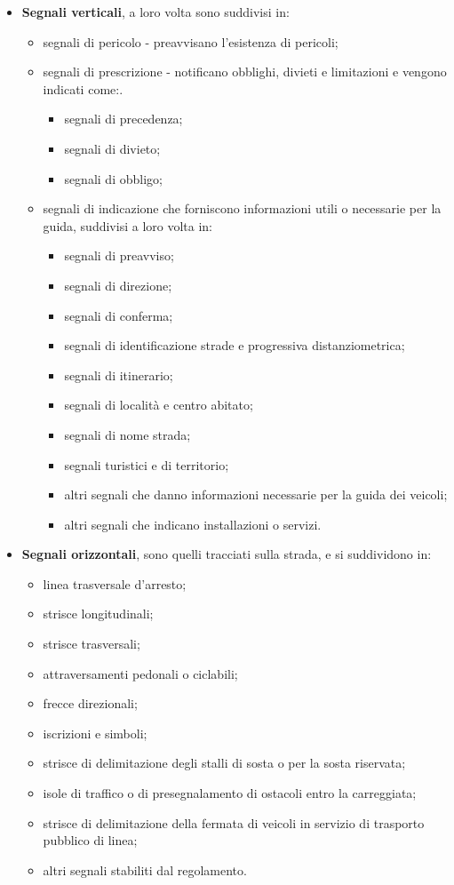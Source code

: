 \begin{itemize}
\begin{itemize}
\end{itemize}
\item \textbf{Segnali verticali}, a loro volta sono suddivisi in:
\begin{itemize}
	\item segnali di pericolo - preavvisano l'esistenza di pericoli;
	\item segnali di prescrizione - notificano obblighi, divieti e limitazioni e vengono indicati come:.
\begin{itemize}
	\item segnali di precedenza;
\item segnali di divieto;
\item segnali di obbligo;
\end{itemize}
\item segnali di indicazione che forniscono informazioni utili o necessarie per la guida, suddivisi a loro volta in:
\begin{itemize}
	\item segnali di preavviso;
	\item segnali di direzione;
	\item segnali di conferma;
	\item segnali di identificazione strade e progressiva distanziometrica;
	\item segnali di itinerario;
	\item segnali di località e centro abitato;
	\item segnali di nome strada;
	\item segnali turistici e di territorio;
	\item altri segnali che danno informazioni necessarie per la guida dei veicoli;
	\item altri segnali che indicano installazioni o servizi.

\end{itemize}\end{itemize}

\item \textbf{Segnali orizzontali}, sono quelli tracciati sulla strada, e si suddividono in:
\begin{itemize}
	\item linea trasversale d'arresto;
	\item strisce longitudinali;
	\item strisce trasversali;
	\item attraversamenti pedonali o ciclabili;
	\item frecce direzionali;
	\item iscrizioni e simboli;
	\item strisce di delimitazione degli stalli di sosta o per la sosta riservata;
	\item isole di traffico o di presegnalamento di ostacoli entro la carreggiata;
	\item strisce di delimitazione della fermata di veicoli in servizio di trasporto pubblico di linea;
	\item altri segnali stabiliti dal regolamento.
\end{itemize}


\end{itemize}
